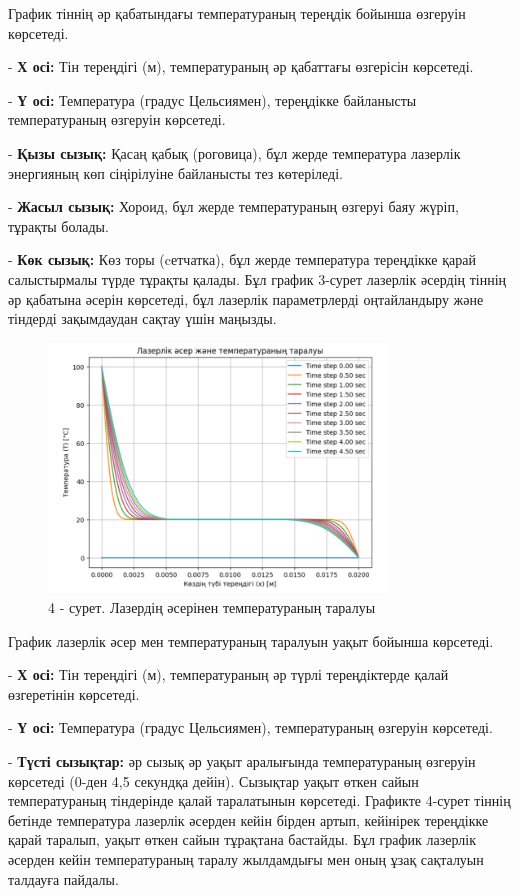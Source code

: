 \begin{multicols}{2}
График тіннің әр қабатындағы температураның тереңдік бойынша өзгеруін
көрсетеді.

- {\bfseries Х осі:} Тін тереңдігі (м), температураның әр қабаттағы
өзгерісін көрсетеді.

- {\bfseries Ү осі:} Температура (градус Цельсиямен), тереңдікке байланысты
температураның өзгеруін көрсетеді.

- {\bfseries Қызы сызық:} Қасаң қабық (роговица), бұл жерде температура
лазерлік энергияның көп сіңірілуіне байланысты тез көтеріледі.

- {\bfseries Жасыл сызық:} Хороид, бұл жерде температураның өзгеруі баяу
жүріп, тұрақты болады.

- {\bfseries Көк сызық:} Көз торы (cетчатка), бұл жерде температура
тереңдікке қарай салыстырмалы түрде тұрақты қалады.
Бұл график 3-сурет лазерлік әсердің тіннің әр қабатына әсерін көрсетеді,
бұл лазерлік параметрлерді оңтайландыру және тіндерді зақымдаудан сақтау
үшін маңызды.
\end{multicols}

\begin{figure}[H]
	\centering
	\includegraphics[width=0.8\textwidth]{media/ict/image23}
	\caption*{4 - сурет. Лазердің әсерінен температураның таралуы}
\end{figure}

\begin{multicols}{2}
График лазерлік әсер мен температураның таралуын уақыт бойынша
көрсетеді.

- {\bfseries Х осі:} Тін тереңдігі (м), температураның әр түрлі
тереңдіктерде қалай өзгеретінін көрсетеді.

- {\bfseries Ү осі:} Температура (градус Цельсиямен), температураның
өзгеруін көрсетеді.

- {\bfseries Түсті сызықтар:} әр сызық әр уақыт аралығында температураның
өзгеруін көрсетеді (0-ден 4,5 секундқа дейін). Сызықтар уақыт өткен
сайын температураның тіндерінде қалай таралатынын көрсетеді.
Графикте 4-сурет тіннің бетінде температура лазерлік әсерден кейін
бірден артып, кейінірек тереңдікке қарай таралып, уақыт өткен сайын
тұрақтана бастайды. Бұл график лазерлік әсерден кейін температураның
таралу жылдамдығы мен оның ұзақ сақталуын талдауға пайдалы.
\end{multicols}

